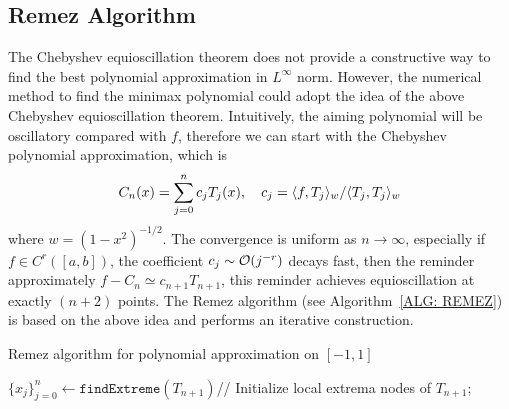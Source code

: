 \subsection{Remez Algorithm}
The Chebyshev equioscillation theorem does not provide a constructive way to find the best polynomial approximation in $L^{\infty}$ norm. However, the numerical method to find the minimax polynomial could adopt the idea of the above Chebyshev equioscillation theorem. Intuitively, the aiming polynomial will be oscillatory compared with $f$, therefore we can start with the Chebyshev polynomial approximation, which is
\begin{equation}
    C_n(x) = \sum_{j=0}^n c_j T_j(x),\quad c_j = \langle {f, T_j} \rangle_w/\langle {T_j,T_j} \rangle_w
\end{equation}
where $w = (1-x^2)^{-1/2}$. The convergence is uniform as $n\to \infty$, especially if $f\in C^r([a, b])$, the coefficient $c_j\sim \mathcal O(j^{-r})$ decays fast, then the reminder approximately $f - C_n\simeq c_{n+1}T_{n+1}$, this reminder achieves equioscillation at exactly $(n+2)$ points. The Remez algorithm (see Algorithm~\ref{ALG: REMEZ}) is based on the above idea and performs an iterative construction.
\begin{algorithm}[!htbp]
    \SetAlgoLined
    \caption{Remez algorithm for polynomial approximation on $[-1,1]$}    \label{ALG: REMEZ}
    $\{x_j\}_{j=0}^n\gets \texttt{findExtreme}(T_{n+1})$//  Initialize local extrema nodes of $T_{n+1}$; 
    \\
\end{algorithm}
